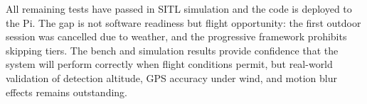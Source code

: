 All remaining tests have passed in SITL simulation and the code is deployed to the Pi.  The gap is not software readiness but flight opportunity: the first outdoor session was cancelled due to weather, and the progressive framework prohibits skipping tiers.  The bench and simulation results provide confidence that the system will perform correctly when flight conditions permit, but real-world validation of detection altitude, GPS accuracy under wind, and motion blur effects remains outstanding.
